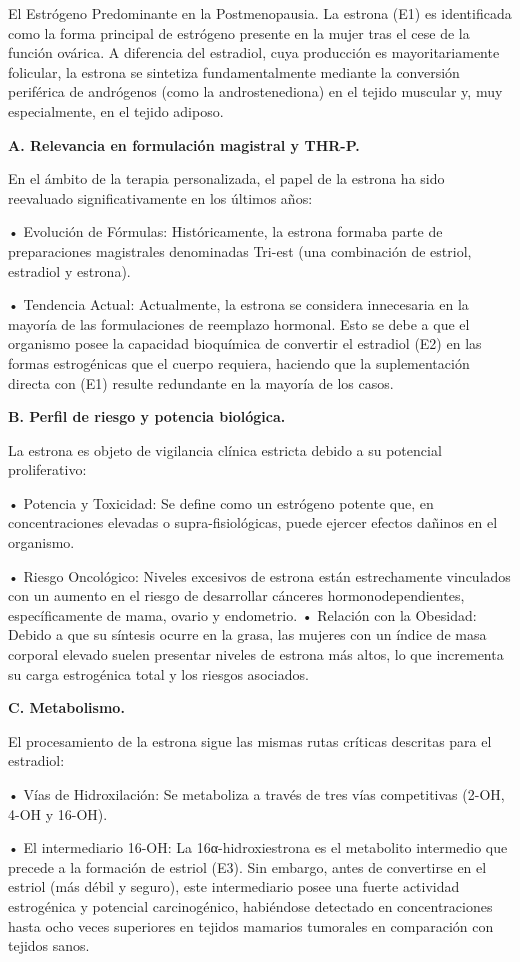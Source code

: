 \documentclass[
  spanish,
]{article}
\begin{document}
El Estrógeno Predominante en la Postmenopausia.
La estrona (E1) es identificada como la forma principal de estrógeno presente en la mujer tras el cese de la función ovárica. A diferencia del estradiol, cuya producción es mayoritariamente folicular, la estrona se sintetiza fundamentalmente mediante la conversión periférica de andrógenos (como la androstenediona) en el tejido muscular y, muy especialmente, en el tejido adiposo.

\textbf{A. Relevancia en formulación magistral y THR-P.}

En el ámbito de la terapia personalizada, el papel de la estrona ha sido reevaluado significativamente en los últimos años:

• Evolución de Fórmulas: Históricamente, la estrona formaba parte de preparaciones magistrales denominadas Tri-est (una combinación de estriol, estradiol y estrona).

• Tendencia Actual: Actualmente, la estrona se considera innecesaria en la mayoría de las formulaciones de reemplazo hormonal. Esto se debe a que el organismo posee la capacidad bioquímica de convertir el estradiol (E2) en las formas estrogénicas que el cuerpo requiera, haciendo que la suplementación directa con (E1) resulte redundante en la mayoría de los casos.

\textbf{B. Perfil de riesgo y potencia biológica.}

La estrona es objeto de vigilancia clínica estricta debido a su potencial proliferativo:

• Potencia y Toxicidad: Se define como un estrógeno potente que, en concentraciones elevadas o supra-fisiológicas, puede ejercer efectos dañinos en el organismo.

• Riesgo Oncológico: Niveles excesivos de estrona están estrechamente vinculados con un aumento en el riesgo de desarrollar cánceres hormonodependientes, específicamente de mama, ovario y endometrio.
• Relación con la Obesidad: Debido a que su síntesis ocurre en la grasa, las mujeres con un índice de masa corporal elevado suelen presentar niveles de estrona más altos, lo que incrementa su carga estrogénica total y los riesgos asociados.

\textbf{C. Metabolismo.}

El procesamiento de la estrona sigue las mismas rutas críticas descritas para el estradiol:

• Vías de Hidroxilación: Se metaboliza a través de tres vías competitivas (2-OH, 4-OH y 16-OH).

• El intermediario 16-OH: La 16α-hidroxiestrona es el metabolito intermedio que precede a la formación de estriol (E3). Sin embargo, antes de convertirse en el estriol (más débil y seguro), este intermediario posee una fuerte actividad estrogénica y potencial carcinogénico, habiéndose detectado en concentraciones hasta ocho veces superiores en tejidos mamarios tumorales en comparación con tejidos sanos.
\end{document}
